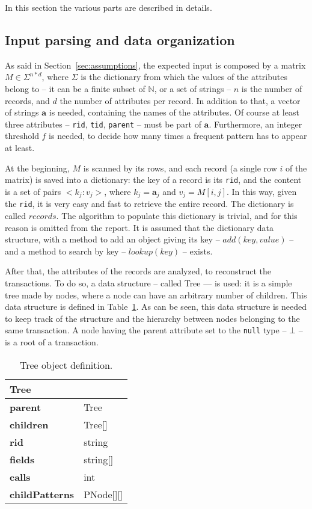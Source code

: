 \documentclass{acm_proc_article-sp-sigmod09}
\begin{document}
In this section the various parts are described in details.

\subsection{Input parsing and data organization}
As said in Section~\ref{sec:assumptions}, the expected input is composed by a matrix $M \in \Sigma^{n * d}$, where $\Sigma$ is the dictionary from which the values of the attributes belong to -- it can be a finite subset of $\mathbb{N}$, or a set of strings -- $n$ is the number of records, and $d$ the number of attributes per record. In addition to that, a vector of strings $\boldsymbol{a}$ is needed, containing the names of the attributes. Of course at least three attributes -- \texttt{rid}, \texttt{tid}, \texttt{parent} -- must be part of $\boldsymbol{a}$. Furthermore, an integer threshold $f$ is needed, to decide how many times a frequent pattern has to appear at least.

At the beginning, $M$ is scanned by its rows, and each record (a single row $i$ of the matrix) is saved into a dictionary: the key of a record is its \texttt{rid}, and the content is a set of pairs $<k_j \colon v_j>$, where $k_j = \boldsymbol{a}_j$ and $v_j = M[i,j]$. In this way, given the \texttt{rid}, it is very easy and fast to retrieve the entire record. The dictionary is called $records$. The algorithm to populate this dictionary is trivial, and for this reason is omitted from the report. It is assumed that the dictionary data structure, with a method to add an object giving its key -- $add(key, value)$ -- and a method to search by key -- $lookup(key)$ -- exists.

After that, the attributes of the records are analyzed, to reconstruct the transactions. To do so, a data structure -- called Tree --- is used: it is a simple tree made by nodes, where a node can have an arbitrary number of children. This data structure is defined in Table~\ref{tab:tree}. As can be seen, this data structure is needed to keep track of the structure and the hierarchy between nodes belonging to the same transaction. A node having the parent attribute set to the \texttt{null} type -- $\bot$ -- is a root of a transaction.

\begin{table}[H]
\centering
\begin{tabular}{|ll|} \hline
\textbf{Tree} & \\ \hline
\textbf{parent} & Tree \\ \hline
\textbf{children} & Tree[] \\ \hline
\textbf{rid} & string \\ \hline
\textbf{fields} & string[] \\ \hline
\textbf{calls} & int \\ \hline
\textbf{childPatterns} & PNode[][] \\
\hline\end{tabular}
\caption{Tree object definition.}
\label{tab:tree}
\end{table}
\end{document}
